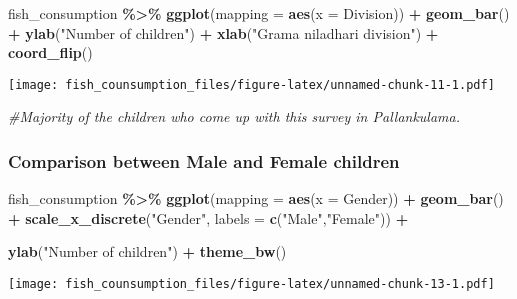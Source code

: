 \documentclass[
]{article}
\newenvironment{Shaded}{\begin{snugshade}}{\end{snugshade}}
\newcommand{\AttributeTok}[1]{\textcolor[rgb]{0.13,0.29,0.53}{#1}}
\newcommand{\CommentTok}[1]{\textcolor[rgb]{0.56,0.35,0.01}{\textit{#1}}}
\newcommand{\FunctionTok}[1]{\textcolor[rgb]{0.13,0.29,0.53}{\textbf{#1}}}
\newcommand{\NormalTok}[1]{#1}
\newcommand{\SpecialCharTok}[1]{\textcolor[rgb]{0.81,0.36,0.00}{\textbf{#1}}}
\newcommand{\StringTok}[1]{\textcolor[rgb]{0.31,0.60,0.02}{#1}}
\begin{document}
\begin{Shaded}
\begin{Highlighting}[]
\NormalTok{fish\_consumption }\SpecialCharTok{\%\textgreater{}\%}
\FunctionTok{ggplot}\NormalTok{(}\AttributeTok{mapping =} \FunctionTok{aes}\NormalTok{(}\AttributeTok{x =}\NormalTok{ Division)) }\SpecialCharTok{+}
\FunctionTok{geom\_bar}\NormalTok{() }\SpecialCharTok{+}
\FunctionTok{ylab}\NormalTok{(}\StringTok{"Number of children"}\NormalTok{) }\SpecialCharTok{+}
\FunctionTok{xlab}\NormalTok{(}\StringTok{"Grama niladhari division"}\NormalTok{) }\SpecialCharTok{+}
\FunctionTok{coord\_flip}\NormalTok{()}
\end{Highlighting}
\end{Shaded}

\texttt{[image: fish\_counsumption\_files/figure-latex/unnamed-chunk-11-1.pdf]}

\begin{Shaded}
\begin{Highlighting}[]
\CommentTok{\#Majority of the children who come up with this survey in Pallankulama. }
\end{Highlighting}
\end{Shaded}

\hypertarget{comparison-between-male-and-female-children}{%
\subsubsection{Comparison between Male and Female
children}\label{comparison-between-male-and-female-children}}

\begin{Shaded}
\begin{Highlighting}[]
\NormalTok{fish\_consumption }\SpecialCharTok{\%\textgreater{}\%}
\FunctionTok{ggplot}\NormalTok{(}\AttributeTok{mapping =} \FunctionTok{aes}\NormalTok{(}\AttributeTok{x =}\NormalTok{ Gender)) }\SpecialCharTok{+}
\FunctionTok{geom\_bar}\NormalTok{() }\SpecialCharTok{+}
\FunctionTok{scale\_x\_discrete}\NormalTok{(}\StringTok{"Gender"}\NormalTok{, }\AttributeTok{labels =} \FunctionTok{c}\NormalTok{(}\StringTok{"Male"}\NormalTok{,}\StringTok{"Female"}\NormalTok{)) }\SpecialCharTok{+}

\FunctionTok{ylab}\NormalTok{(}\StringTok{"Number of children"}\NormalTok{) }\SpecialCharTok{+}
\FunctionTok{theme\_bw}\NormalTok{()}
\end{Highlighting}
\end{Shaded}

\texttt{[image: fish\_counsumption\_files/figure-latex/unnamed-chunk-13-1.pdf]}
\end{document}
